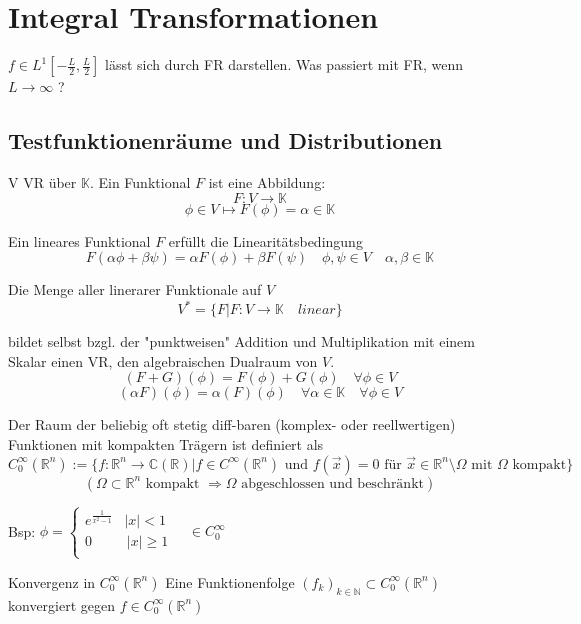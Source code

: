\section{Integral Transformationen}
    $f \in L^1[-\frac{L}{2}, \frac{L}{2}]$ lässt sich durch
    FR darstellen. Was passiert mit FR, wenn 
    $L \rightarrow \infty$ ?


    \subsection{Testfunktionenräume und Distributionen}

    \begin{Def}
        V VR über $\mathbb{K}$. Ein Funktional $F$ ist eine Abbildung:
        $$F: V \rightarrow \mathbb{K}$$
        $$ \phi \in V \mapsto F(\phi) = \alpha \in \mathbb{K}$$

        Ein lineares Funktional $F$ erfüllt die Linearitätsbedingung
        $$F(\alpha \phi + \beta \psi) = \alpha F(\phi) + \beta F(\psi) \quad \phi , \psi \in V \quad \alpha, \beta \in \mathbb{K} $$

        Die Menge aller linerarer Funktionale auf $V$
        $$V^\ast =  \{ F | F:V \rightarrow \mathbb{K} \quad linear \} $$

        bildet selbst bzgl. der "punktweisen" Addition und Multiplikation
        mit einem Skalar einen VR, den algebraischen Dualraum von $V$.
        $$(F+G)(\phi) = F(\phi) + G(\phi) \quad \forall \phi \in V $$
        $$(\alpha F)(\phi) = \alpha (F)(\phi)  \quad \forall \alpha \in \mathbb{K} \quad \forall \phi \in V $$
    \end{Def}

    \begin{Def}
        Der Raum der beliebig oft stetig diff-baren (komplex- oder 
        reellwertigen) Funktionen mit kompakten Trägern ist definiert als
        $$C_0^\infty (\mathbb{R}^n)  := \{ f:\mathbb{R}^n \rightarrow \mathbb{C}(\mathbb{R}) | f \in C^\infty(\mathbb{R}^n) \textrm{ und } f(\vec{x})=0 \textrm{ für } \vec{x} \in \mathbb{R}^n \setminus  \Omega \textrm{ mit } \Omega \textrm{ kompakt} \}$$
        $$( \Omega \subset \mathbb{R}^n \textrm{ kompakt } \Rightarrow \Omega \textrm{ abgeschlossen und beschränkt} )$$

        Bsp: $\phi = \left\{ \begin{array}{ll}
            e^{\frac{1}{x^2-1}} & |x| < 1 \\
            0 & \, |x| \geq 1 \\
            \end{array}
            \right. \quad \in C_0^{\infty} $
    \end{Def}

    \begin{Def}{Konvergenz in $C_0^{\infty}(\mathbb{R}^n)$}
        Eine Funktionenfolge $(f_k)_{k \in \mathbb{N}} \subset C_0^{\infty}(\mathbb{R}^n)$ konvergiert gegen
        $f \in C_0^{\infty}(\mathbb{R}^n)$

    \end{Def}